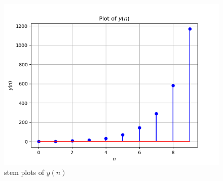 \documentclass[journal,12pt,onecolumn]{IEEEtran}
\theoremstyle{remark}
\begin{document}
\begin{figure}[h!]
    \centering
    \includegraphics[width=\columnwidth]{ncert-maths/11/9/3/14/figs/plot.png}
    \caption{stem plots of $y(n)$}
    \label{fig:11.9.3.14.2}
\end{figure}
\end{document}

